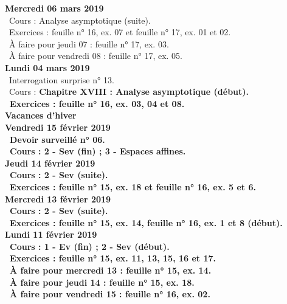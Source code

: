 \documentclass[12pt,a4paper]{article}
\begin{document}
\noindent\textbf{Mercredi 06 mars 2019} \\
\bu\ Cours : Analyse asymptotique (suite).\\
\bu\ Exercices : feuille n° 16, ex. 07 et feuille n° 17, ex. 01 et 02.\\
\bu\ À faire pour jeudi 07 : feuille n° 17, ex. 03.\\
\bu\ À faire pour vendredi 08 : feuille n° 17, ex. 05.\vspace{.4cm}\\

\noindent\textbf{\bf Lundi 04 mars 2019} \\
\bu\ Interrogation surprise n° 13.\\
\bu\ Cours : \bf Chapitre XVIII \rm : Analyse asymptotique 
(début).\\
\bu\ Exercices : feuille n° 16, ex. 03, 04 et 08.\vspace{.4cm}\\

\noindent\textbf{\bf Vacances d'hiver }\\

\noindent\textbf{Vendredi 15 février 2019}\\
\bu\ Devoir surveillé n° 06.\\
\bu\ Cours : 2 - Sev (fin) ; 3 - Espaces affines.\vspace{.4cm}\\
 
\noindent\textbf{Jeudi 14 février 2019}\\
\bu\ Cours : 2 - Sev (suite).\\
\bu\ Exercices : feuille n° 15, ex. 18 et feuille n° 16, ex. 5 et 6.\vspace{.4cm}\\
 
\noindent\textbf{Mercredi 13 février 2019} \\
\bu\ Cours : 2 - Sev (suite).\\
\bu\ Exercices : feuille n° 15, ex. 14, feuille n° 16, ex. 1 et 8 (début).\vspace{.4cm}\\

\noindent\textbf{\bf Lundi 11 février 2019} \\
\bu\ Cours : 1 - Ev (fin) ; 2 - Sev (début).\\
\bu\ Exercices : feuille n° 15, ex. 11, 13, 15, 16 et 17.\\
\bu\ À faire pour mercredi 13 : feuille n° 15, ex. 14.\\
\bu\ À faire pour jeudi 14 : feuille n° 15, ex. 18.\\
\bu\ À faire pour vendredi 15 : feuille n° 16, ex. 02.\vspace{.4cm}\\
\end{document}
